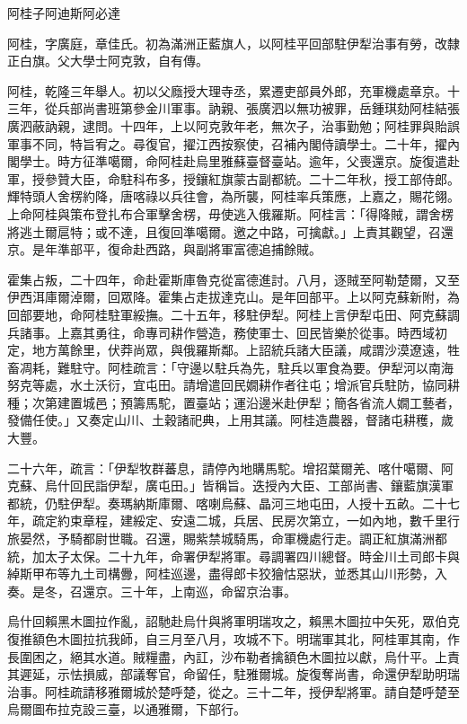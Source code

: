 
\begin{pinyinscope}
阿桂子阿迪斯阿必達

阿桂，字廣庭，章佳氏。初為滿洲正藍旗人，以阿桂平回部駐伊犁治事有勞，改隸正白旗。父大學士阿克敦，自有傳。

阿桂，乾隆三年舉人。初以父廕授大理寺丞，累遷吏部員外郎，充軍機處章京。十三年，從兵部尚書班第參金川軍事。訥親、張廣泗以無功被罪，岳鍾琪劾阿桂結張廣泗蔽訥親，逮問。十四年，上以阿克敦年老，無次子，治事勤勉；阿桂罪與貽誤軍事不同，特旨宥之。尋復官，擢江西按察使，召補內閣侍讀學士。二十年，擢內閣學士。時方征準噶爾，命阿桂赴烏里雅蘇臺督臺站。逾年，父喪還京。旋復遣赴軍，授參贊大臣，命駐科布多，授鑲紅旗蒙古副都統。二十二年秋，授工部侍郎。輝特頭人舍楞約降，唐喀祿以兵往會，為所襲，阿桂率兵策應，上嘉之，賜花翎。上命阿桂與策布登扎布合軍擊舍楞，毋使逃入俄羅斯。阿桂言：「得降賊，謂舍楞將逃土爾扈特；或不達，且復回準噶爾。邀之中路，可擒獻。」上責其觀望，召還京。是年準部平，復命赴西路，與副將軍富德追捕餘賊。

霍集占叛，二十四年，命赴霍斯庫魯克從富德進討。八月，逐賊至阿勒楚爾，又至伊西洱庫爾淖爾，回眾降。霍集占走拔達克山。是年回部平。上以阿克蘇新附，為回部要地，命阿桂駐軍綏撫。二十五年，移駐伊犁。阿桂上言伊犁屯田、阿克蘇調兵諸事。上嘉其勇往，命專司耕作營造，務使軍士、回民皆樂於從事。時西域初定，地方萬餘里，伏莽尚眾，與俄羅斯鄰。上詔統兵諸大臣議，咸謂沙漠遼遠，牲畜凋耗，難駐守。阿桂疏言：「守邊以駐兵為先，駐兵以軍食為要。伊犁河以南海努克等處，水土沃衍，宜屯田。請增遣回民嫺耕作者往屯；增派官兵駐防，協同耕種；次第建置城邑；預籌馬駝，置臺站；運沿邊米赴伊犁；簡各省流人嫺工藝者，發備任使。」又奏定山川、土穀諸祀典，上用其議。阿桂造農器，督諸屯耕穫，歲大豐。

二十六年，疏言：「伊犁牧群蕃息，請停內地購馬駝。增招葉爾羌、喀什噶爾、阿克蘇、烏什回民詣伊犁，廣屯田。」皆稱旨。迭授內大臣、工部尚書、鑲藍旗漢軍都統，仍駐伊犁。奏瑪納斯庫爾、喀喇烏蘇、晶河三地屯田，人授十五畝。二十七年，疏定約束章程，建綏定、安遠二城，兵居、民房次第立，一如內地，數千里行旅晏然，予騎都尉世職。召還，賜紫禁城騎馬，命軍機處行走。調正紅旗滿洲都統，加太子太保。二十九年，命署伊犁將軍。尋調署四川總督。時金川土司郎卡與綽斯甲布等九土司構釁，阿桂巡邊，盡得郎卡狡獪怙惡狀，並悉其山川形勢，入奏。是冬，召還京。三十年，上南巡，命留京治事。

烏什回賴黑木圖拉作亂，詔馳赴烏什與將軍明瑞攻之，賴黑木圖拉中矢死，眾伯克復推額色木圖拉抗我師，自三月至八月，攻城不下。明瑞軍其北，阿桂軍其南，作長圍困之，絕其水道。賊糧盡，內訌，沙布勒者擒額色木圖拉以獻，烏什平。上責其遲延，示怯損威，部議奪官，命留任，駐雅爾城。旋復奪尚書，命還伊犁助明瑞治事。阿桂疏請移雅爾城於楚呼楚，從之。三十二年，授伊犁將軍。請自楚呼楚至烏爾圖布拉克設三臺，以通雅爾，下部行。


\end{pinyinscope}
